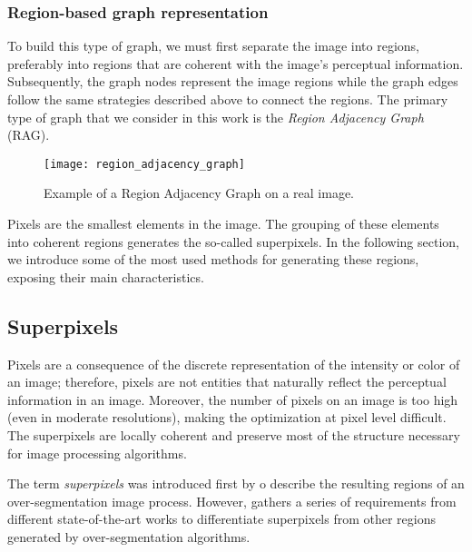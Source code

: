 \subsubsection{Region-based graph representation}

To build this type of graph, we must first separate the image into regions, preferably into regions that are coherent with the image's perceptual information. Subsequently, the graph nodes represent the image regions while the graph edges follow the same strategies described above to connect the regions. The primary type of graph that we consider in this work is the \textit{Region Adjacency Graph }(RAG).


\begin{figure}[!ht]
	\centering
	\texttt{[image: region\_adjacency\_graph]}       	    
    \caption{Example of a Region Adjacency Graph on a real image.}
    \label{fig:region_adjacency_graph}    
\end{figure}


Pixels are the smallest elements in the image. The grouping of these elements into coherent regions generates the so-called superpixels. In the following section, we introduce some of the most used methods for generating these regions, exposing their main characteristics.


\subsection{Superpixels}

Pixels are a consequence of the discrete representation of the intensity or color of an image; therefore, pixels are not entities that naturally reflect the perceptual information in an image. Moreover, the number of pixels on an image is too high (even in moderate resolutions), making the optimization at pixel level difficult. The superpixels are locally coherent and preserve most of the structure necessary for image processing algorithms.

The term \textit{superpixels} was introduced first by \cite{Ren.Malik:ICCV:2003} o describe the resulting regions of an over-segmentation image process. However,  \cite{Stutz.Hermans.ea:CVIU:2018} gathers a series of requirements from different state-of-the-art works to differentiate superpixels from other regions generated by over-segmentation algorithms. 

